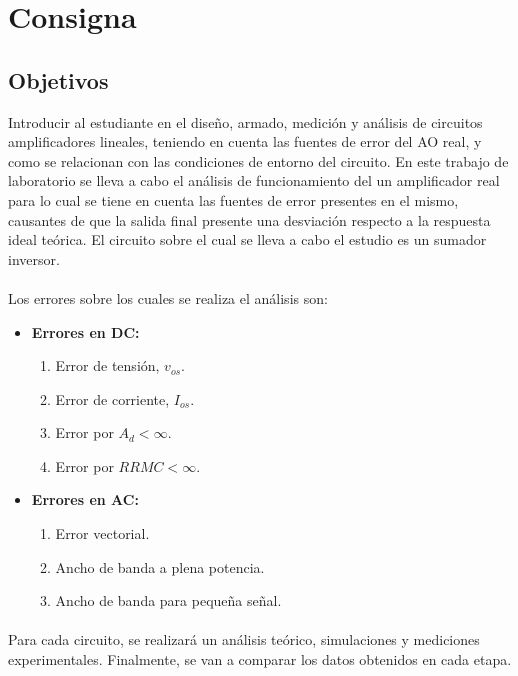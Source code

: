 \documentclass[11pt, a4paper]{article}
\begin{document}

\newpage
\section{Consigna}
\paragraph{}
\subsection{Objetivos}
Introducir al estudiante en el diseño, armado, medición y análisis de circuitos amplificadores lineales, teniendo en cuenta las fuentes de error del AO real, y como se relacionan con
las condiciones de entorno del circuito.
En este trabajo de laboratorio se lleva a cabo el análisis de funcionamiento del un amplificador real para lo cual se tiene en cuenta las fuentes de error presentes en el mismo, causantes de que la salida final presente una desviación respecto a la respuesta ideal teórica. El circuito sobre el cual se lleva a cabo el estudio es un sumador inversor. 
\paragraph{}
Los errores sobre los cuales se realiza el análisis son:
\begin{itemize}
    \item \textbf{Errores en DC:}
    \begin{enumerate}
	\item Error de tensión, $v_{os}$.
	\item Error de corriente, $I_{os}$.
	\item Error por $A_d<\infty$.
        \item Error por $RRMC<\infty$.
    \end{enumerate}
    \item \textbf{Errores en AC:}
    \begin{enumerate}
        \item Error vectorial.
        \item Ancho de banda a plena potencia.
        \item Ancho de banda para pequeña señal.
    \end{enumerate}
\end{itemize}
\paragraph{}
Para cada circuito, se realizará un análisis teórico, simulaciones y mediciones experimentales. Finalmente, se van a comparar los datos obtenidos en cada etapa.
\newpage
\end{document}
